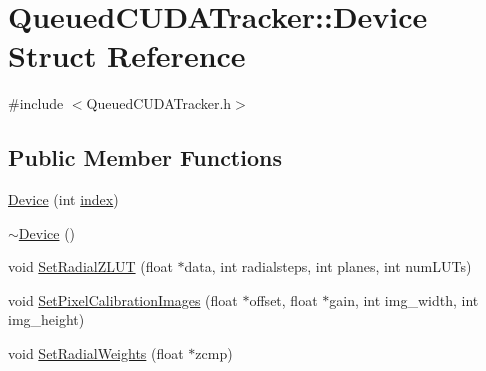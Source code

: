 \hypertarget{struct_queued_c_u_d_a_tracker_1_1_device}{}\section{Queued\+C\+U\+D\+A\+Tracker\+:\+:Device Struct Reference}
\label{struct_queued_c_u_d_a_tracker_1_1_device}


{\ttfamily \#include $<$Queued\+C\+U\+D\+A\+Tracker.\+h$>$}

\subsection*{Public Member Functions}
\begin{DoxyCompactItemize}
\item 
\hyperlink{struct_queued_c_u_d_a_tracker_1_1_device_a2f469c266e353b76379b233d3c6b8975}{Device} (int \hyperlink{struct_queued_c_u_d_a_tracker_1_1_device_a4e5ef8ff6e97b1f1b875ccbda3ca9bbb}{index})
\item 
\hyperlink{struct_queued_c_u_d_a_tracker_1_1_device_a6948e83cf8c2613db74fd6655dea9260}{$\sim$\+Device} ()
\item 
void \hyperlink{struct_queued_c_u_d_a_tracker_1_1_device_ab0aa256972dee41b7c7f0ed71bf038b1}{Set\+Radial\+Z\+L\+UT} (float $\ast$data, int radialsteps, int planes, int num\+L\+U\+Ts)
\item 
void \hyperlink{struct_queued_c_u_d_a_tracker_1_1_device_af39911fe630e90540daf52911e170367}{Set\+Pixel\+Calibration\+Images} (float $\ast$offset, float $\ast$gain, int img\+\_\+width, int img\+\_\+height)
\item 
void \hyperlink{struct_queued_c_u_d_a_tracker_1_1_device_a0a65205b772af5dd99151769865c2395}{Set\+Radial\+Weights} (float $\ast$zcmp)
\end{DoxyCompactItemize}
